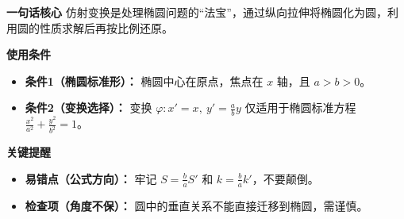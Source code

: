 \begin{summarybox}
	\textbf{\textcolor{CSummary}{一句话核心}}
	仿射变换是处理椭圆问题的“法宝”，通过纵向拉伸将椭圆化为圆，利用圆的性质求解后再按比例还原。

	\medskip
	\textbf{\textcolor{CSummary}{使用条件}}
	\begin{itemize}[leftmargin=*, itemsep=0.5em, topsep=0.4em]
		\item \textbf{条件1（椭圆标准形）：} 椭圆中心在原点，焦点在 $x$ 轴，且 $a>b>0$。
		\item \textbf{条件2（变换选择）：} 变换 $\varphi: x'=x,\ y'=\frac{a}{b}y$ 仅适用于椭圆标准方程 $\frac{x^2}{a^2}+\frac{y^2}{b^2}=1$。
	\end{itemize}

	\medskip
	\textbf{\textcolor{CSummary}{关键提醒}}
	\begin{itemize}[leftmargin=*, itemsep=0.5em, topsep=0.4em]
		\item \textbf{易错点（公式方向）：} 牢记 $S = \frac{b}{a}S'$ 和 $k = \frac{b}{a}k'$，不要颠倒。
		\item \textbf{检查项（角度不保）：} 圆中的垂直关系不能直接迁移到椭圆，需谨慎。
	\end{itemize}

\end{summarybox}
